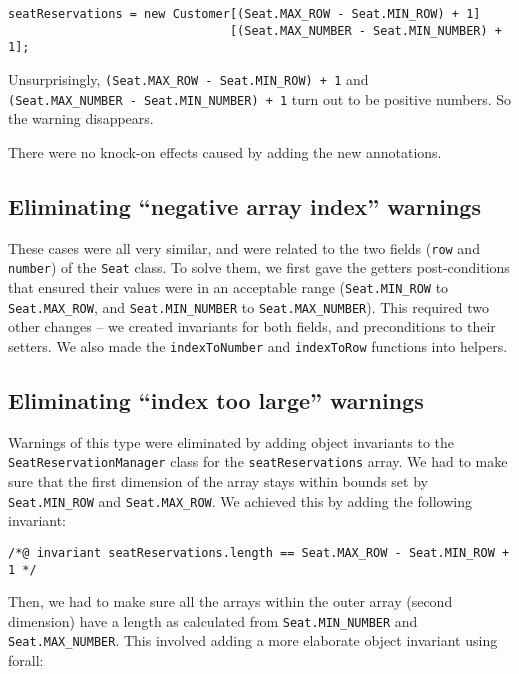 \documentclass[11pt]{article}
\begin{document}
\noindent
\begin{verbatim}
seatReservations = new Customer[(Seat.MAX_ROW - Seat.MIN_ROW) + 1]
                               [(Seat.MAX_NUMBER - Seat.MIN_NUMBER) + 1];
\end{verbatim}

Unsurprisingly, \verb|(Seat.MAX_ROW - Seat.MIN_ROW) + 1| and \\
\verb|(Seat.MAX_NUMBER - Seat.MIN_NUMBER) + 1| turn out to be positive numbers. So the warning disappears.

There were no knock-on effects caused by adding the new annotations.

\subsection{Eliminating ``negative array index'' warnings}

These cases were all very similar, and were related to the two fields (\verb|row| and \verb|number|) of the \verb|Seat| class. To solve them, we first gave the getters post-conditions that ensured their values were in an acceptable range (\verb|Seat.MIN_ROW| to \verb|Seat.MAX_ROW|, and \verb|Seat.MIN_NUMBER| to \verb|Seat.MAX_NUMBER|). This required two other changes -- we created invariants for both fields, and preconditions to their setters. We also made the \verb|indexToNumber| and \verb|indexToRow| functions into helpers.

\subsection{Eliminating ``index too large'' warnings}

Warnings of this type were eliminated by adding object invariants to the \\
\verb|SeatReservationManager| class for the \verb|seatReservations| array. We had to make sure that the first dimension of the array stays within bounds set by \verb|Seat.MIN_ROW| and \verb|Seat.MAX_ROW|. We achieved this by adding the following invariant:

\noindent
\begin{verbatim}
/*@ invariant seatReservations.length == Seat.MAX_ROW - Seat.MIN_ROW + 1 */
\end{verbatim}

Then, we had to make sure all the arrays within the outer array (second dimension) have a length as calculated from \verb|Seat.MIN_NUMBER| and \verb|Seat.MAX_NUMBER|. This involved adding a more elaborate object invariant using forall:
\end{document}
